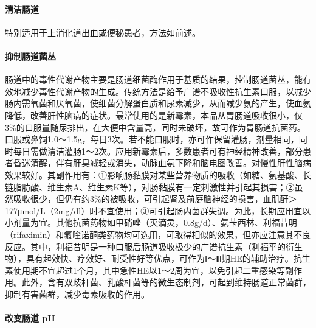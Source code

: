 \paragraph{清洁肠道}

特别适用于上消化道出血或便秘患者，方法如前述。

\paragraph{抑制肠道菌丛}

肠道中的毒性代谢产物主要是肠道细菌酶作用于基质的结果，控制肠道菌丛，能有效地减少毒性代谢产物的生成。传统方法是给予广谱不吸收性抗生素口服，以减少肠内需氧菌和厌氧菌，使细菌分解蛋白质和尿素减少，从而减少氨的产生，使血氨降低，改善肝性脑病的症状。最常使用的是新霉素，本品从胃肠道吸收很小，仅3\%的口服量随尿排出，在大便中含量高，同时未破坏，故可作为胃肠道抗菌药。口服或鼻饲1.0～1.5g，每日3次。若不能口服时，亦可作保留灌肠，剂量相同，同时每日需做清洁灌肠1～2次。应用新霉素后，多数患者可有神经精神改善，部分患者昏迷清醒，伴有肝臭减轻或消失，动脉血氨下降和脑电图改善。对慢性肝性脑病效果较好。其副作用有：①影响肠黏膜对某些营养物质的吸收（如糖、氨基酸、长链脂肪酸、维生素A、维生素K等），对肠黏膜有一定刺激性并引起其损害；②虽然吸收很少，但仍有约3\%的被吸收，可引起肾及前庭脑神经的损害，血肌酐＞
177μmol/L（2mg/dl）时不宜使用；③可引起肠内菌群失调。为此，长期应用宜以小剂量为宜。其他抗菌药物如甲硝唑（灭滴灵，0.8g/d）、氨苄西林、利福昔明（rifaximin）和氟喹诺酮类药物均可选用，可取得相似的效果，但亦应注意其不良反应。其中，利福昔明是一种口服后肠道吸收极少的广谱抗生素（利福平的衍生物），具有起效快、疗效好、耐受性好等优点，可作为Ⅰ～Ⅲ期HE的辅助治疗。抗生素使用期不宜超过1个月，其中急性HE以1～2周为宜，以免引起二重感染等副作用。此外，含有双歧杆菌、乳酸杆菌等的微生态制剂，可起到维持肠道正常菌群，抑制有害菌群，减少毒素吸收的作用。

\paragraph{改变肠道 pH}

